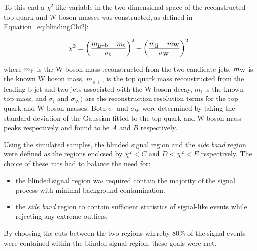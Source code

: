 To this end a $\chi^{2}$-like variable in the two dimensional space of the reconstructed top quark and W boson masses was constructed, as defined in Equation~\ref{eq:blindingChi2}:

\begin{equation}\label{eq:blindingChi2}
   \chi^{2} = {\left(\frac{m_{\mathrm{jj+b}}-m_{\mathrm{t}}}{\sigma_{\mathrm{t}}}\right)}^{2} + {\left(\frac{m_{\rm jj}-m_{\rm W}}{\sigma_{\mathrm{W}}}\right)}^{2}
\end{equation}

where $m_{\rm jj}$ is the W boson mass reconstructed from the two candidate jets, $m_{\rm W}$ is the known W boson mass, $m_{\mathrm{jj+b}}$ is the top quark mass reconstructed from the leading b-jet and two jets associated with the W boson decay, $m_{\mathrm{t}}$ is the known top mass, and $\sigma_{\mathrm{t}}$ and $\sigma_{\mathrm{W}})$ are the reconstruction resolution terms for the top quark and W boson masses.
Both $\sigma_{\mathrm{t}}$ and $\sigma_{\mathrm{W}}$ were determined by taking the standard deviation of the Gaussian fitted to the top quark and W boson mass peaks respectively and found to be $A$ and $B$ respectively.


Using the simulated samples, the blinded signal region and the \emph{side band} region were defined as the regions enclosed by $\chi^{2} < C$ and $D < \chi^{2} <E $ respectively.
The choice of these cuts had to balance the need for:
\begin{itemize}
\item the blinded signal region was required contain the majority of the signal process with minimal background contamination.
\item the \emph{side band} region to contain sufficient statistics of signal-like events while rejecting any extreme outliers.
\end{itemize}

By choosing the cuts between the two regions whereby 80\% of the signal events were contained within the blinded signal region, these goals were met.

